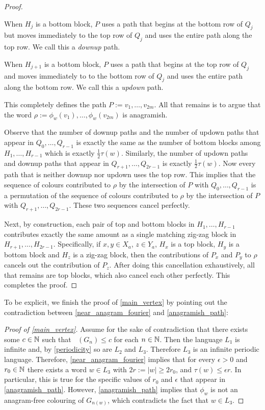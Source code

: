 \documentclass{patmorin}
\DeclareMathOperator{\afcn}{\dot{\chi}_\pi}
\begin{document}
\begin{proof}
    \begin{compactenum}
        \item When $H_j$ is a bottom block, $P$ uses a path that begins at the bottom row of $Q_j$ but moves immediately to the top row of $Q_j$ and uses the entire path along the top row. We call this a \emph{downup} path.
        \item When $H_{j+1}$ is a bottom block, $P$ uses a path that begins at the top row of $Q_j$ and moves immediately to to the bottom row of $Q_j$ and uses the entire path along the bottom row.  We call this a \emph{updown} path.
    \end{compactenum}
    This completely defines the path $P:=v_1,\ldots,v_{2m}$. All that remains is to argue that the word $\rho:=\phi_w(v_1),\ldots,\phi_w(v_{2m})$ is anagramish.

    Observe that the number of downup paths and the number of updown paths that appear in $Q_0,\ldots,Q_{r-1}$ is exactly the same as the number of bottom blocks among $H_1,\ldots,H_{r-1}$ which is exactly $\tfrac12\tau(w)$.  Similarly, the number of updown paths and downup paths that appear in $Q_{r+1},\ldots,Q_{2r-1}$ is exactly $\tfrac12\tau(w)$.  Now every path that is neither downup nor updown uses the top row.  This implies that the sequence of colours contributed to $\rho$ by  the intersection of $P$ with $Q_0,\ldots,Q_{r-1}$ is a permutation of the sequence of colours contributed to $\rho$ by the intersection of $P$ with $Q_{r+1},\ldots,Q_{2r-1}$.  These two sequences cancel perfectly.

    Next, by construction, each pair of top and bottom blocks in $H_1,\ldots,H_{r-1}$ contributes exactly the same amount as a single matching zig-zag block in $H_{r+1},\ldots,H_{2r-1}$.  Specifically, if $x,y\in X_a$, $z\in Y_a$, $H_x$ is a top block, $H_y$ is a bottom block and $H_z$ is a zig-zag block, then the contributions of $P_x$ and $P_y$ to $\rho$ cancels out the contribution of $P_z$. After doing this cancellation exhaustively, all that remains are top blocks, which also cancel each other perfectly.  This completes the proof.
\end{proof}


To be explicit, we finish the proof of \cref{main_vertex} by pointing out the contradiction between \cref{near_anagram_fourier} and \cref{anagramish_path}:

\begin{proof}[Proof of \cref{main_vertex}]
    Assume for the sake of contradiction that there exists some $c\in\mathbb{N}$ such that $\afcn(G_n)\le c$ for each $n\in\mathbb{N}$.  Then the language $L_1$ is infinite and, by \cref{periodicity} so are $L_2$ and $L_3$.  Therefore $L_3$ is an infinite periodic language.  Therefore,  \cref{near_anagram_fourier} implies that for every $\epsilon>0$ and $r_0\in\mathbb{N}$ there exists a word $w\in L_3$ with $2r:=|w|\ge 2r_0$, and $\tau(w)\le\epsilon r$.  In particular, this is true for the specific values of $r_0$ and $\epsilon$ that appear in \cref{anagramish_path}.  However, \cref{anagramish_path} implies that $\phi_w$ is not an anagram-free colouring of $G_{n(w)}$, which contradicts the fact that $w\in L_3$.
\end{proof}
\end{document}
